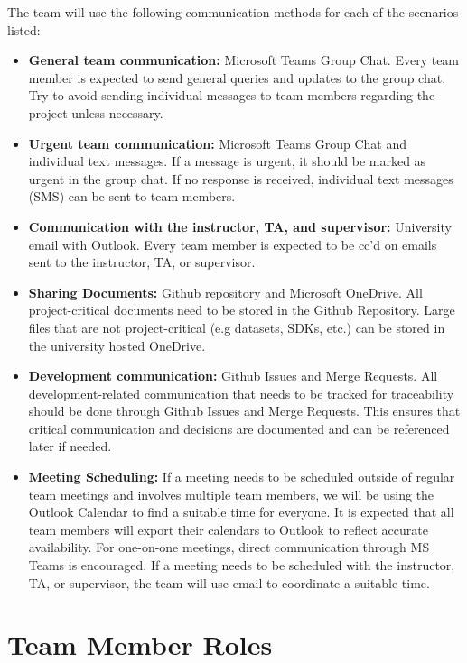\documentclass{article}
\begin{document}
The team will use the following communication methods for each of the scenarios
listed:
\begin{itemize}
  \item \textbf{General team communication:} Microsoft Teams Group Chat. Every
  team member is expected to send general queries and updates to the group chat.
  Try to avoid sending individual messages to team members regarding the project
  unless necessary.
  \item \textbf{Urgent team communication:} Microsoft Teams Group Chat and
  individual text messages. If a message is urgent, it should be marked as
  urgent in the group chat. If no response is received, individual text messages
  (SMS) can be sent to team members.
  \item \textbf{Communication with the instructor, TA, and supervisor:}
  University email with Outlook. Every team member is expected to be cc'd on
  emails sent to the instructor, TA, or supervisor.
  \item \textbf{Sharing Documents:} Github repository and Microsoft OneDrive.
  All project-critical documents need to be stored in the Github Repository.
  Large files that are not project-critical (e.g datasets, SDKs, etc.) can be
  stored in the university hosted OneDrive.
  \item \textbf{Development communication:} Github Issues and Merge Requests.
  All development-related communication that needs to be tracked for
  traceability should be done through Github Issues and Merge Requests. This
  ensures that critical communication and decisions are documented and can be
  referenced later if needed.
  \item \textbf{Meeting Scheduling:} If a meeting needs to be scheduled outside
  of regular team meetings and involves multiple team members, we will be using
  the Outlook Calendar to find a suitable time for everyone. It is expected that
  all team members will export their calendars to Outlook to reflect accurate
  availability. For one-on-one meetings, direct communication through MS Teams
  is encouraged. If a meeting needs to be scheduled with the instructor, TA, or
  supervisor, the team will use email to coordinate a suitable time. 
\end{itemize}

\section{Team Member Roles}
\end{document}
